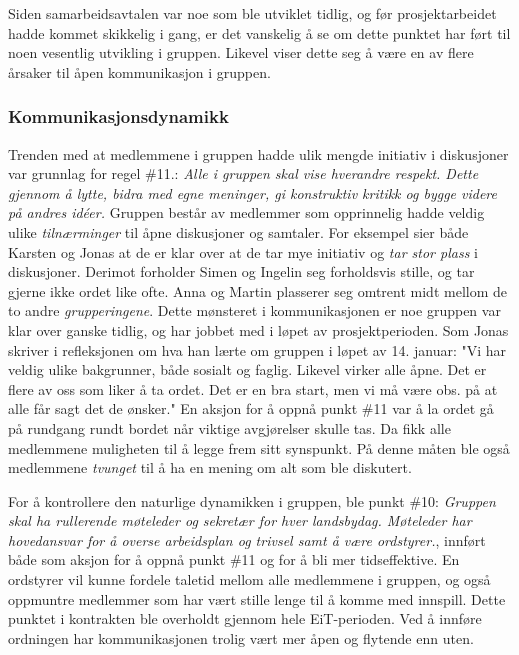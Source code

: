 Siden samarbeidsavtalen var noe som ble utviklet tidlig, og før prosjektarbeidet hadde kommet skikkelig i gang, er det vanskelig å se om dette punktet har ført til noen vesentlig utvikling i gruppen.
Likevel viser dette seg å være en av flere årsaker til åpen kommunikasjon i gruppen. \\

\subsubsection{Kommunikasjonsdynamikk}

Trenden med at medlemmene i gruppen hadde ulik mengde initiativ i diskusjoner var grunnlag for regel \#11.: \textit{Alle i gruppen skal vise hverandre respekt. Dette gjennom å lytte, bidra med egne meninger, gi konstruktiv kritikk og bygge videre på andres id\'{e}er.} 
Gruppen består av medlemmer som opprinnelig hadde veldig ulike \textit{tilnærminger} til åpne diskusjoner og samtaler.
For eksempel sier både Karsten og Jonas at de er klar over at de tar mye initiativ og \textit{tar stor plass} i diskusjoner.
Derimot forholder Simen og Ingelin seg forholdsvis stille, og tar gjerne ikke ordet like ofte.
Anna og Martin plasserer seg omtrent midt mellom de to andre \textit{grupperingene}.
Dette mønsteret i kommunikasjonen er noe gruppen var klar over ganske tidlig, og har jobbet med i løpet av prosjektperioden.
Som Jonas skriver i refleksjonen om hva han lærte om gruppen i løpet av 14. januar:
"Vi har veldig ulike bakgrunner, både sosialt og faglig. Likevel virker alle åpne. Det er flere av oss som liker å ta ordet. Det er en bra start, men vi må være obs. på at alle får sagt det de ønsker."
En aksjon for å oppnå punkt \#11 var å la ordet gå på rundgang rundt bordet når viktige avgjørelser skulle tas. Da fikk alle medlemmene muligheten til å legge frem sitt synspunkt. På denne måten ble også medlemmene \textit{tvunget} til å ha en mening om alt som ble diskutert.

For å kontrollere den naturlige dynamikken i gruppen, ble punkt \#10: \textit{Gruppen skal ha rullerende møteleder og sekretær for hver landsbydag. Møteleder har hovedansvar for å overse arbeidsplan og trivsel samt å være ordstyrer.}, innført både som aksjon for å oppnå punkt \#11 og for å bli mer tidseffektive. En ordstyrer vil kunne fordele taletid mellom alle medlemmene i gruppen, og også oppmuntre medlemmer som har vært stille lenge til å komme med innspill. Dette punktet i kontrakten ble overholdt gjennom hele EiT-perioden. Ved å innføre ordningen har kommunikasjonen trolig vært mer åpen og flytende enn uten.

